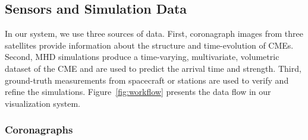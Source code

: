 \documentclass[journal]{vgtc}                %
\begin{document}
\subsection{Sensors and Simulation Data} \label{sec:data}
In our system, we use three sources of data. First, coronagraph images from three satellites provide information about the structure and time-evolution of CMEs. Second, MHD simulations produce a time-varying, multivariate, volumetric dataset of the CME and are used to predict the arrival time and strength. Third, ground-truth measurements from spacecraft or stations are used to verify and refine the simulations. Figure~\ref{fig:workflow} presents the data flow in our visualization system.

\subsubsection{Coronagraphs} \label{sec:coronagraph}
\end{document}
